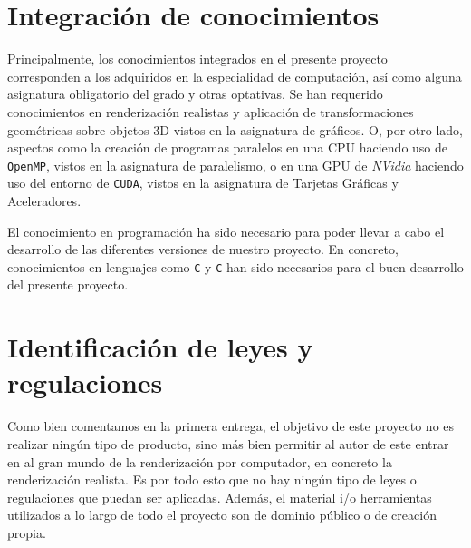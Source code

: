 \documentclass[titlepage,12pt]{article}
\begin{document}
\section{Integración de conocimientos}

Principalmente, los conocimientos integrados en el presente proyecto corresponden a los adquiridos en la especialidad de computación, así como alguna asignatura obligatorio del grado y otras optativas. Se han requerido conocimientos en renderización realistas y aplicación de transformaciones geométricas sobre objetos 3D vistos en la asignatura de gráficos. O, por otro lado, aspectos como la creación de programas paralelos en una CPU haciendo uso de \texttt{OpenMP}, vistos en la asignatura de paralelismo, o en una GPU de \textit{NVidia} haciendo uso del entorno de \texttt{CUDA}, vistos en la asignatura de Tarjetas Gráficas y Aceleradores.

El conocimiento en programación ha sido necesario para poder llevar a cabo el desarrollo de las diferentes versiones de nuestro proyecto. En concreto, conocimientos en lenguajes como \texttt{C} y \texttt{C} han sido necesarios para el buen desarrollo del presente proyecto.

\section{Identificación de leyes y regulaciones}

Como bien comentamos en la primera entrega, el objetivo de este proyecto no es realizar ningún tipo de producto, sino más bien permitir al autor de este entrar en al gran mundo de la renderización por computador, en concreto la renderización realista. Es por todo esto que no hay ningún tipo de leyes o regulaciones que puedan ser aplicadas. Además, el material i/o herramientas utilizados a lo largo de todo el proyecto son de dominio público o de creación propia.


\newpage

\printbibliography

\listoffigures

\listoftables
\end{document}
